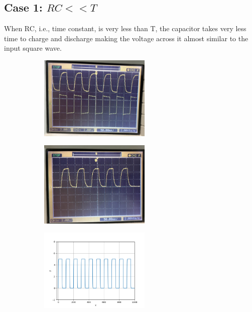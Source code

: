 \documentclass[a4paper,12pt]{article}
\begin{document}
\subsection*{Case 1: \(RC << T\)}
When RC, i.e., time constant, is very less than T, the capacitor takes very less time to charge and discharge making the voltage across it almost similar to the input square wave.
\begin{figure}[h!]
	\begin{subfigure}[b]{10pt}
	\includegraphics[width = 150pt]{figs/steady_1.jpg}
	\end{subfigure}
	\hspace{135pt}
	\begin{subfigure}[b]{10pt}
	\includegraphics[width = 150pt]{./figs/trans_1.jpg}
	\end{subfigure}
	\hspace{135pt}
	\begin{subfigure}[b]{10pt}
	\includegraphics[width = 150pt]{./figs/fig1.png}
	\end{subfigure}
\end{figure}
\end{document}
